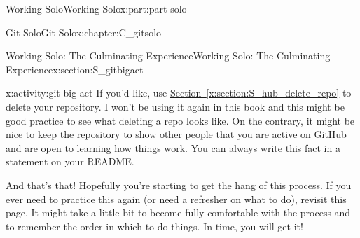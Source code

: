 \documentclass[oneside,10pt,]{book}
\newcommand{\xreffont}{\relax}
\begin{document}
\begin{partptx}{Working Solo}{}{Working Solo}{}{}{x:part:part-solo}
\begin{chapterptx}{Git Solo}{}{Git Solo}{}{}{x:chapter:C_gitsolo}
\begin{sectionptx}{Working Solo: The Culminating Experience}{}{Working Solo: The Culminating Experience}{}{}{x:section:S_gitbigact}
\begin{activity}{}{x:activity:git-big-act}
If you'd like, use \hyperref[x:section:S_hub_delete_repo]{Section~{\xreffont\ref{x:section:S_hub_delete_repo}}} to delete your repository. I won't be using it again in this book and this might be good practice to see what deleting a repo looks like. On the contrary, it might be nice to keep the repository to show other people that you are active on GitHub and are open to learning how things work. You can always write this fact in a statement on your README.%
\end{activity}%
And that's that! Hopefully you're starting to get the hang of this process. If you ever need to practice this again (or need a refresher on what to do), revisit this page. It might take a little bit to become fully comfortable with the process and to remember the order in which to do things. In time, you will get it!%
\end{sectionptx}
\end{chapterptx}
\end{partptx}
%
%
\typeout{************************************************}
\typeout{************************************************}
%
\end{document}
